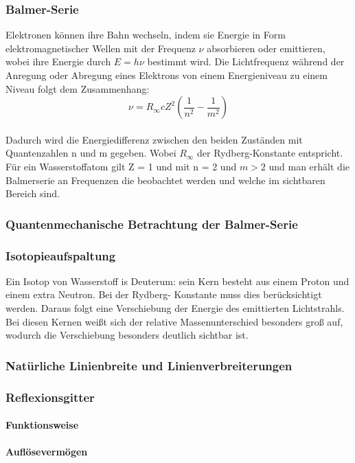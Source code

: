 \documentclass[ngerman]{scrartcl}
\begin{document}
\subsubsection{Balmer-Serie}
Elektronen können ihre Bahn wechseln, indem sie Energie in Form elektromagnetischer Wellen mit der Frequenz $\nu$ absorbieren oder emittieren, wobei ihre Energie durch $E = h\nu$ bestimmt wird. Die Lichtfrequenz während der Anregung oder Abregung eines Elektrons von einem Energieniveau zu einem Niveau folgt dem Zusammenhang:
\begin{equation}
    \nu = R_{\infty} c Z^2 \left( \frac{1}{n^2} - \frac{1}{m^2} \right)
\end{equation}\\
Dadurch wird die Energiedifferenz zwischen den beiden Zuständen mit Quantenzahlen n und m gegeben. Wobei $R_{\infty}$ der Rydberg-Konstante entspricht.\\
Für ein Wasserstoffatom gilt Z = 1 und mit n = 2 und $m> 2$ und man erhält die Balmerserie an Frequenzen die beobachtet werden und welche im sichtbaren Bereich sind.
\subsubsection{Quantenmechanische Betrachtung der Balmer-Serie}
\subsubsection{Isotopieaufspaltung}
Ein Isotop von Wasserstoff is Deuterum: sein Kern besteht aus einem Proton und einem extra Neutron.
Bei der Rydberg- Konstante muss dies berücksichtigt werden. Daraus folgt eine Verschiebung der Energie des emittierten Lichtstrahls. Bei diesen Kernen weißt sich der relative Massenunterschied besonders groß auf, wodurch die Verschiebung besonders deutlich sichtbar ist.
\subsubsection{Natürliche Linienbreite und Linienverbreiterungen}
\subsubsection{Reflexionsgitter}
\paragraph{Funktionsweise}
\paragraph{Auflösevermögen}
\end{document}
